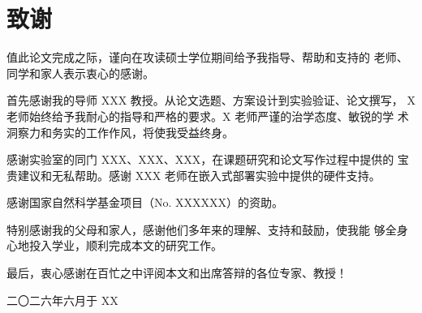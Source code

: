 
\chapter*{致\quad 谢}

\thispagestyle{fancy}

\par 值此论文完成之际，谨向在攻读硕士学位期间给予我指导、帮助和支持的
老师、同学和家人表示衷心的感谢。

\par 首先感谢我的导师 XXX 教授。从论文选题、方案设计到实验验证、论文撰写，
X 老师始终给予我耐心的指导和严格的要求。X 老师严谨的治学态度、敏锐的学
术洞察力和务实的工作作风，将使我受益终身。

\par 感谢实验室的同门 XXX、XXX、XXX，在课题研究和论文写作过程中提供的
宝贵建议和无私帮助。感谢 XXX 老师在嵌入式部署实验中提供的硬件支持。

\par 感谢国家自然科学基金项目（No. XXXXXX）的资助。

\par 特别感谢我的父母和家人，感谢他们多年来的理解、支持和鼓励，使我能
够全身心地投入学业，顺利完成本文的研究工作。

\par 最后，衷心感谢在百忙之中评阅本文和出席答辩的各位专家、教授！

\vspace{2em}
\begin{flushright}
\fangsong{} 二〇二六年六月\quad 于 XX
\end{flushright}
